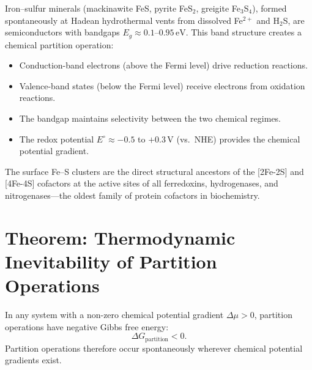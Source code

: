 \begin{example}
\label{ex:iron_sulfur_partition}
Iron--sulfur minerals (mackinawite FeS, pyrite FeS$_2$, greigite Fe$_3$S$_4$),
formed spontaneously at Hadean hydrothermal vents from dissolved Fe$^{2+}$ and
H$_2$S, are semiconductors with bandgaps $E_g \approx 0.1$--$0.95\,\mathrm{eV}$.
This band structure creates a chemical partition operation:
\begin{itemize}
  \item Conduction-band electrons (above the Fermi level) drive reduction reactions.
  \item Valence-band states (below the Fermi level) receive electrons from
        oxidation reactions.
  \item The bandgap maintains selectivity between the two chemical regimes.
  \item The redox potential $E^{\circ} \approx -0.5$ to $+0.3\,\mathrm{V}$
        (vs.\ NHE) provides the chemical potential gradient.
\end{itemize}
The surface Fe--S clusters are the direct structural ancestors of the [2Fe-2S]
and [4Fe-4S] cofactors at the active sites of all ferredoxins, hydrogenases,
and nitrogenases---the oldest family of protein cofactors in biochemistry.
\end{example}

\section{Theorem: Thermodynamic Inevitability of Partition Operations}
\label{sec:thermodynamic_inevitability}

\begin{theorem}
\label{thm:thermodynamic_inevitability}
In any system with a non-zero chemical potential gradient $\Delta\mu > 0$,
partition operations have negative Gibbs free energy:
\begin{equation}
  \Delta G_{\mathrm{partition}} < 0.
  \label{eq:dg_partition_negative}
\end{equation}
Partition operations therefore occur spontaneously wherever chemical potential
gradients exist.
\end{theorem}

